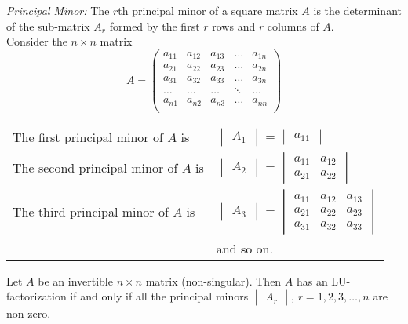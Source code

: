 \documentclass[12pt,class=book,crop=false]{standalone}
\begin{document}
\emph{Principal Minor:} The $ r  $th principal minor of a square matrix $ A $ is the determinant of the sub-matrix $ A_r $ formed by the first $ r $ rows and $ r $ columns of $ A $.\\
Consider the $ n\times n $ matrix
\[
    A=\begin{pmatrix}
        a_{11} & a_{12} & a_{13} & \dots  & a_{1n} \\
        a_{21} & a_{22} & a_{23} & \dots  & a_{2n} \\
        a_{31} & a_{32} & a_{33} & \dots  & a_{3n} \\
        \dots  & \dots  & \dots  & \ddots & \dots  \\
        a_{n1} & a_{n2} & a_{n3} & \dots  & a_{nn} \\
    \end{pmatrix}
\]
\begin{table}[H]
    \begin{tabular}{ll}
        The first principal minor of $ A $ is  & $ \begin{vmatrix}
                A_1
            \end{vmatrix}=\begin{vmatrix}
                a_{11}
            \end{vmatrix} $ \\
        The second principal minor of $ A $ is & $ \begin{vmatrix}
                A_2
            \end{vmatrix}=\begin{vmatrix}
                a_{11} & a_{12} \\
                a_{21} & a_{22}
            \end{vmatrix} $ \\
        The third principal minor of $ A $ is  & $ \begin{vmatrix}
                A_3
            \end{vmatrix}=\begin{vmatrix}
                a_{11} & a_{12} & a_{13} \\
                a_{21} & a_{22} & a_{23} \\
                a_{31} & a_{32} & a_{33}
            \end{vmatrix} $ \\
                                               & and so on.
    \end{tabular}
\end{table}
\begin{thm}
    Let $ A $ be an invertible $ n\times n $ matrix (non-singular). Then $ A $ has an LU-factorization if and only if all the principal minors $ \begin{vmatrix}
            A_r
        \end{vmatrix},\,r=1,2,3,\dots,n $ are non-zero.
\end{thm}
\end{document}
